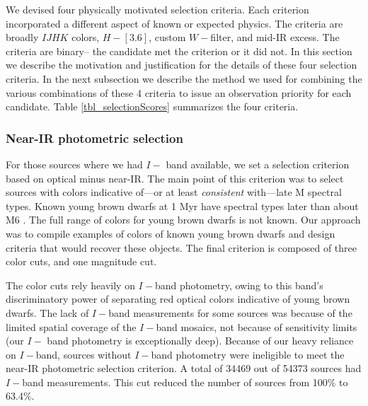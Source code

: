 We devised four physically motivated selection criteria.  Each criterion incorporated a different aspect of known or expected physics.  The criteria are broadly $IJHK$ colors, $H- [3.6]$, custom $W-$filter, and mid-IR excess.  The criteria are binary-- the candidate met the criterion or it did not.  In this section we describe the motivation and justification for the details of these four selection criteria.  In the next subsection we describe the method we used for combining the various combinations of these 4 criteria to issue an observation priority for each candidate.  Table \ref{tbl_selectionScores} summarizes the four criteria.



\subsubsection{Near-IR photometric selection}
\label{sec_NIR_selection}

For those sources where we had $I-$ band available, we set a selection criterion based on optical minus near-IR.  The main point of this criterion was to select sources with colors indicative of---or at least \emph{consistent} with---late M spectral types.  Known young brown dwarfs at 1 Myr have spectral types later than about M6 \citep{2012ARA&A..50...65L}.  The full range of colors for young brown dwarfs is not known.  Our approach was to compile examples of colors of known young brown dwarfs and design criteria that would recover these objects.  The final criterion is composed of three color cuts, and one magnitude cut.

The color cuts rely heavily on $I-$band photometry, owing to this band's discriminatory power of separating red optical colors indicative of young brown dwarfs.  The lack of $I-$band measurements for some sources was because of the limited spatial coverage of the $I-$band mosaics, not because of sensitivity limits (our $I-$ band photometry is exceptionally deep).  Because of our heavy reliance on $I-$band, sources without $I-$band photometry were ineligible to meet the near-IR photometric selection criterion.  A total of 34469 out of 54373 sources had $I-$band measurements.  This cut reduced the number of sources from 100\% to 63.4\%.

